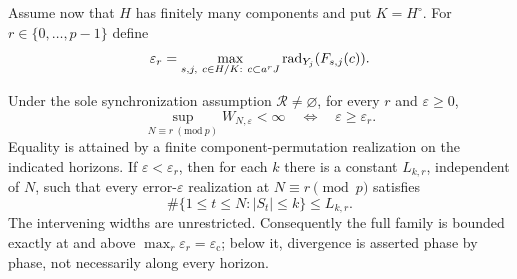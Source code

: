 Assume now that $H$ has finitely many components and put $K=H^\circ$. For $r\in\{0,\ldots,p-1\}$ define
\begin{equation}\label{eq:phaseradius55}
 \varepsilon_r=\max_{s,j,\ c\in H/K:\ c\subset a^rJ}
                    \operatorname{rad}_{Y_j}(F_{s,j}(c)).
\end{equation}
\begin{theorem}\label{thm:phases55}
Under the sole synchronization assumption $\mathcal R\ne\varnothing$, for every $r$ and $\varepsilon\ge0$,
\[
 \sup_{N\equiv r\ (\mathrm{mod}\ p)}W_{N,\varepsilon}<\infty
             \quad\Longleftrightarrow\quad
             \varepsilon\ge\varepsilon_r.
\]
Equality is attained by a finite component-permutation realization on the indicated horizons. If $\varepsilon<\varepsilon_r$, then for each $k$ there is a constant $L_{k,r}$, independent of $N$, such that every error-$\varepsilon$ realization at $N\equiv r\pmod p$ satisfies
\[
                 \#\{1\le t\le N:|S_t|\le k\}\le L_{k,r}.
\]
The intervening widths are unrestricted. Consequently the full family is bounded exactly at and above $\max_r\varepsilon_r=\varepsilon_{\mathrm c}$; below it, divergence is asserted phase by phase, not necessarily along every horizon.
\end{theorem}
